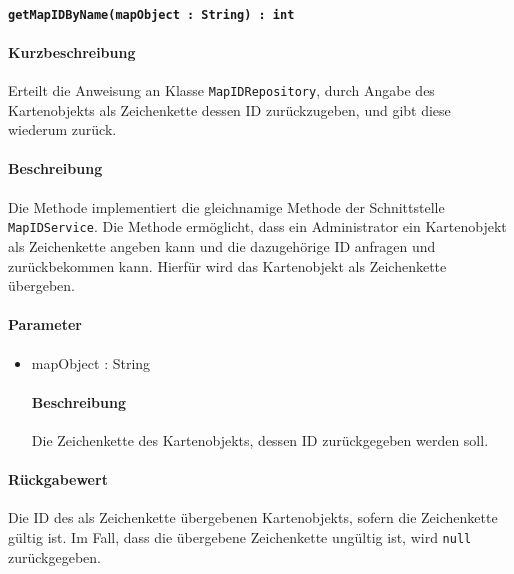 \paragraph{\texttt{getMapIDByName(mapObject : String) : int}}%
\paragraph*{Kurzbeschreibung}
Erteilt die Anweisung an Klasse \texttt{MapIDRepository}, durch Angabe des Kartenobjekts als Zeichenkette dessen ID zurückzugeben, und gibt diese wiederum zurück.
\paragraph*{Beschreibung}
Die Methode implementiert die gleichnamige Methode der Schnittstelle \texttt{MapIDService}.
Die Methode ermöglicht, dass ein Administrator ein Kartenobjekt als Zeichenkette angeben kann und die dazugehörige ID anfragen und zurückbekommen kann.
Hierfür wird das Kartenobjekt als Zeichenkette übergeben.
\paragraph*{Parameter}
\begin{itemize}
    \item mapObject : String
    		\paragraph*{Beschreibung}
    		Die Zeichenkette des Kartenobjekts, dessen ID zurückgegeben werden soll.
\end{itemize}
\paragraph*{Rückgabewert}
Die ID des als Zeichenkette übergebenen Kartenobjekts, sofern die Zeichenkette gültig ist.
Im Fall, dass die übergebene Zeichenkette ungültig ist, wird \texttt{null} zurückgegeben.
